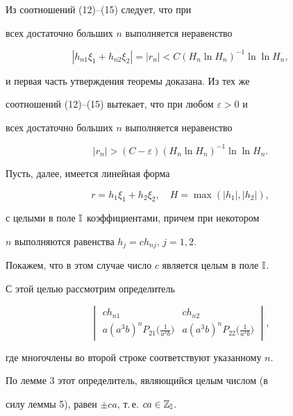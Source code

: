 Из соотношений (12)--(15) следует, что при 


всех достаточно больших $n$ выполняется неравенство 


$$ 


|h_{n1}\xi_1+h_{n2}\xi_2|=|r_n|<C(H_n\ln H_n)^{-1} 


\ln\ln H_n, 


$$ 


и первая часть утверждения теоремы доказана. Из тех же 


соотношений (12)--(15) вытекает, что при любом $\varepsilon>0$ и 


всех достаточно больших $n$ выполняется неравенство 


\begin{equation} 


|r_n|>(C-\varepsilon)(H_n\ln H_n)^{-1}\ln\ln H_n. 


\end{equation} 


Пусть, далее, имеется линейная форма 


\begin{equation} 


r=h_1\xi_1+h_2\xi_2,\quad H=\max(|h_1|,|h_2|), 


\end{equation} 


с целыми в поле $\Bbb I$ коэффициентами, причем при некотором 


$n$ выполняются равенства $h_j=ch_{nj}$, $j=1,2$. 


Покажем, что в этом случае число $c$ является целым в поле $\Bbb I$. 


С этой целью рассмотрим определитель 


$$ 


\begin{vmatrix} 


ch_{n1} & ch_{n2} \\ 


a(a^3b)^n P_{21}\big(\frac{1}{a^3b}\big) & 


a(a^3b)^n P_{22}\big(\frac{1}{a^3b}\big) 


\end{vmatrix} 


, 


$$ 


где многочлены во второй строке соответствуют указанному $n$. 


По лемме 3 этот определитель, являющийся целым числом (в 


силу леммы 5), равен $\pm ca$, т.\,е. $ca\in\Bbb Z_{\Bbb I}$. 


